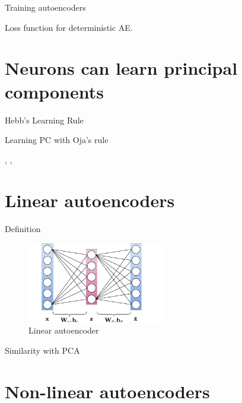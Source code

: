 \documentclass{beamer}
\begin{document}
  \begin{frame}{Training autoencoders}

    Loss function for deterministic AE.
    
  \end{frame}

  \section{Neurons can learn principal components}

  \begin{frame}{Hebb's Learning Rule}

  \end{frame}

  \begin{frame}{Learning PC with Oja's rule}

    \cite{Becker1991}, \cite{Oja1982}, \cite{Oja1992}
    
  \end{frame}

  \section{Linear autoencoders}

  \begin{frame}{Definition}

    \begin{figure}
      \includegraphics[width=6cm]{rc/linear-autoencoder}
      \caption{Linear autoencoder}\label{fig:linear-autoencoder}
    \end{figure}
    
  \end{frame}

  \begin{frame}{Similarity with PCA}

    \cite{Plaut2018}
    
  \end{frame}

  \section{Non-linear autoencoders}
\end{document}
